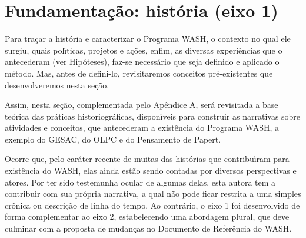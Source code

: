 \documentclass[
12pt,		%
openright,	%
twoside,  %
a4paper,			%
chapter=TITLE,		%
english,			%
french,				%
spanish,			%
brazil				%
]{USPSC-classe/USPSC}
\begin{document}
\section[Fundamenta\c{c}\~ao: hist\'oria (eixo 1)]{Fundamenta\c{c}\~ao: hist\'oria (eixo 1)}\label{Fundamenta\c{c}\~ao: hist\'oria (eixo 1)}
Para  tra\c{c}ar a hist\'oria e caracterizar o Programa WASH, o contexto no qual ele surgiu, quais pol\'{\i}ticas, projetos e  a\c{c}\~oes, enfim, as diversas experi\^encias que o antecederam (ver Hip\'oteses), faz-se  necess\'ario que seja definido e aplicado o m\'etodo. Mas, antes de defini-lo, revisitaremos conceitos pr\'e-existentes que  desenvolveremos nesta se\c{c}\~ao.

















Assim, nesta se\c{c}\~ao, complementada pelo Ap\^endice A, ser\'a revisitada a base te\'orica das pr\'aticas historiogr\'aficas, dispon\'{\i}veis para construir as narrativas sobre atividades e conceitos, que antecederam a exist\^encia do Programa WASH, a exemplo do GESAC, do OLPC e do Pensamento de Papert.



































Ocorre que, pelo car\'ater recente de muitas das hist\'orias que contribu\'{\i}ram para exist\^encia do WASH, elas ainda est\~ao sendo contadas por diversos perspectivas e atores. Por ter sido testemunha ocular de algumas delas, esta autora tem a contribuir com sua pr\'opria narrativa, a qual n\~ao pode ficar restrita a uma simples cr\^onica ou descri\c{c}\~ao de linha do tempo. Ao contr\'ario, o eixo 1 foi desenvolvido de forma complementar ao eixo 2, estabelecendo uma abordagem plural, que deve culminar com a proposta de mudan\c{c}as no Documento de Refer\^encia do WASH.
\end{document}
